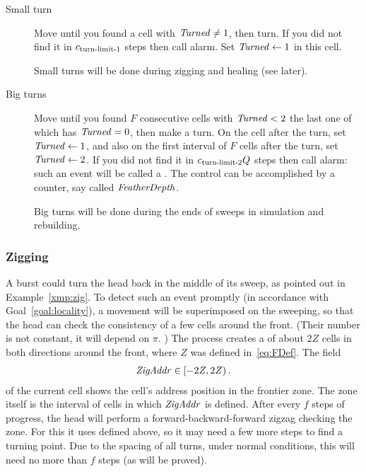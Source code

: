 \documentclass[11pt]{memoir}
\theoremstyle{definition} %
\newcommand{\fld}[1]{\ensuremath{\textit{#1\/}}}
\renewcommand{\f}{f} %
\newcommand{\F}{F}
\newcommand{\Q}{Q}
\newcommand{\Z}{Z}
\newcommand{\Turned}{\fld{Turned}}
\newcommand{\FDepth}{\fld{FeatherDepth}}
\newcommand{\ZigAddr}{\fld{ZigAddr}}
\newcommand{\cns}[1]{c_{\textrm{\upshape #1}}}
\begin{document}
\begin{description}
\item[Small turn]
Move until you found a cell with \( \Turned\ne 1 \), then turn.
If you did not find it in \( \cns{turn-limit-1} \) steps then call alarm.
Set \( \Turned\gets 1 \) in this cell.

Small turns will be done during zigging and healing (see later).

\item[Big turns]
Move until you found \( \F \) consecutive cells with \( \Turned<2 \)
the last one of which has \( \Turned=0 \), then make a turn.
On the cell after the turn, set \( \Turned\gets 1 \),
and also on the first interval of  \( \F \) cells after the turn, set \( \Turned\gets 2 \).
If you did not find it in \( \cns{turn-limit-2}\Q \)
steps then call alarm: such an event will be called a .
The control can be accomplished by a counter, say called \( \FDepth \).

Big turns will be done during the ends of sweeps in simulation and rebuilding.
\end{description}
     

\subsubsection{Zigging}\label{sec:zigging}

A burst could turn the head back in the middle of its sweep,
as pointed out in Example~\ref{xmp:zig}.
To detect such an event promptly (in accordance with Goal~\ref{goal:locality}),
a  movement will be superimposed on the sweeping,
so that the head can check the consistency of a few cells  around the front.
(Their number is not constant, it will depend on \( \pi \). )
The process creates a  of about \( 2\Z \) cells in both directions around the front,
where \( \Z \) was defined in~\eqref{eq:FDef}.
The field
\begin{align*}
  \ZigAddr\in\lint{-2\Z}{2\Z}.
\end{align*}
of the current cell shows the cell's address position in the frontier zone.
The zone itself is the interval of cells in which \( \ZigAddr \) is defined.
After every \( \f \) steps of progress, the head will perform a forward-backward-forward
zigzag checking the zone.
For this it uses  defined above, so it may need a few more steps to find
a turning point.
Due to the spacing of all turns, under normal conditions, this will need
no more than \( \f \) steps (as will be proved).
\end{document}
